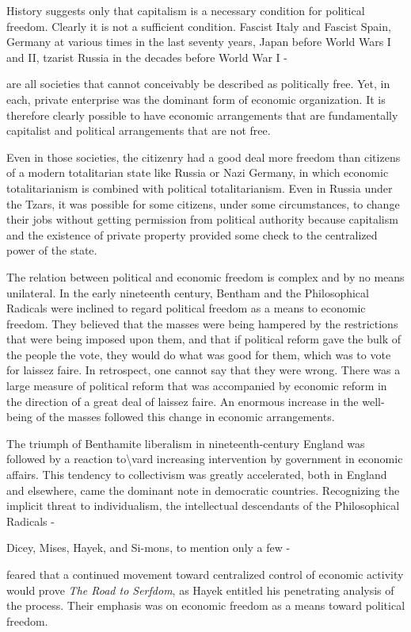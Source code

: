 \documentclass[11pt,openany]{book}
\begin{document}
History suggests only that capitalism is a necessary condition for political freedom. Clearly it is not a sufficient condition. Fascist Italy and Fascist Spain, Germany at various times in the last seventy years, Japan before World Wars I and II, tzarist Russia in the decades before World War I -

are all societies that cannot conceivably be described as politically free. Yet, in each, private enterprise was the dominant form of economic organization. It is therefore clearly possible to have economic arrangements that are fundamentally capitalist and political arrangements that are not free.

Even in those societies, the citizenry had a good deal more freedom than citizens of a modern totalitarian state like Russia or Nazi Germany, in which economic totalitarianism is combined with political totalitarianism. Even in Russia under the Tzars, it was possible for some citizens, under some circumstances, to change their jobs without getting permission from political authority because capitalism and the existence of private property provided some check to the centralized power of the state.

The relation between political and economic freedom is complex and by no means unilateral. In the early nineteenth century, Bentham and the Philosophical Radicals were inclined to regard political freedom as a means to economic freedom. They believed that the masses were being hampered by the restrictions that were being imposed upon them, and that if political reform gave the bulk of the people the vote, they would do what was good for them, which was to vote for laissez faire. In retrospect, one cannot say that they were wrong. There was a large measure of political reform that was accompanied by economic reform in the direction of a great deal of laissez faire. An enormous increase in the well-being of the masses followed this change in economic arrangements.

The triumph of Benthamite liberalism in nineteenth-century England was followed by a reaction to\textbackslash{}vard increasing intervention by government in economic affairs. This tendency to collectivism was greatly accelerated, both in England and elsewhere, came the dominant note in democratic countries. Recognizing the implicit threat to individualism, the intellectual descendants of the Philosophical Radicals -

Dicey, Mises, Hayek, and Si-mons, to mention only a few -

feared that a continued movement toward centralized control of economic activity would prove \emph{The Road to Serfdom}, as Hayek entitled his penetrating analysis of the process. Their emphasis was on economic freedom as a means toward political freedom.
\end{document}
